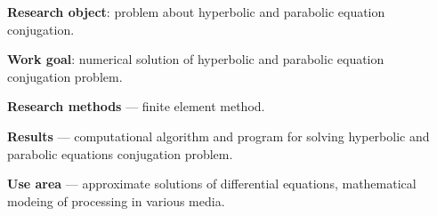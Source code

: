 \textbf{Research object}: problem about hyperbolic and parabolic equation \\conjugation.

\textbf{Work goal}: numerical solution of hyperbolic and parabolic equation \\ conjugation problem.

\textbf{Research methods} --- finite element method.

\textbf{Results} --- computational algorithm and program for solving hyperbolic
and parabolic equations conjugation problem.

\textbf{Use area} --- approximate solutions of differential equations, mathematical modeing of processing in various media.
